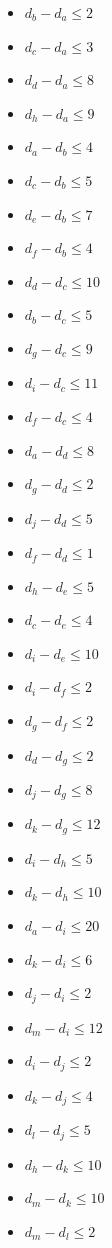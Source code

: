 \documentclass[../report/main.tex]{subfiles}
\begin{document}
\begin{enumerate}[a)]
  \begin{itemize}
    \item $d_b - d_a \leq 2$
    \item $d_c - d_a \leq 3$
    \item $d_d - d_a \leq 8$
    \item $d_h - d_a \leq 9$
    \item $d_a - d_b \leq 4$
    \item $d_c - d_b \leq 5$
    \item $d_e - d_b \leq 7$
    \item $d_f - d_b \leq 4$
    \item $d_d - d_c \leq 10$
    \item $d_b - d_c \leq 5$
    \item $d_g - d_c \leq 9$
    \item $d_i - d_c \leq 11$
    \item $d_f - d_c \leq 4$
    \item $d_a - d_d \leq 8$
    \item $d_g - d_d \leq 2$
    \item $d_j - d_d \leq 5$
    \item $d_f - d_d \leq 1$
    \item $d_h - d_e \leq 5$
    \item $d_c - d_e \leq 4$
    \item $d_i - d_e \leq 10$
    \item $d_i - d_f \leq 2$
    \item $d_g - d_f \leq 2$
    \item $d_d - d_g \leq 2$
    \item $d_j - d_g \leq 8$
    \item $d_k - d_g \leq 12$
    \item $d_i - d_h \leq 5$
    \item $d_k - d_h \leq 10$
    \item $d_a - d_i \leq 20$
    \item $d_k - d_i \leq 6$
    \item $d_j - d_i \leq 2$
    \item $d_m - d_i \leq 12$
    \item $d_i - d_j \leq 2$
    \item $d_k - d_j \leq 4$
    \item $d_l - d_j \leq 5$
    \item $d_h - d_k \leq 10$
    \item $d_m - d_k \leq 10$
    \item $d_m - d_l \leq 2$
  \end{itemize}


\end{enumerate}
\end{document}
